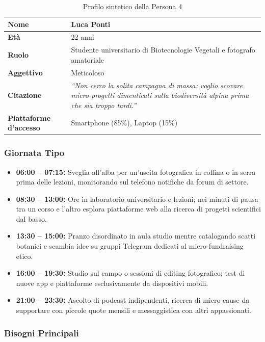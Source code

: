 \documentclass[11pt,a4paper]{article}
\begin{document}
\begin{table}[h!]
\centering
\small
\begin{tabular}{|p{3.5cm}|p{11.5cm}|}
\hline
\textbf{Nome} & Luca Ponti \\ \hline
\textbf{Età} & 22 anni \\ \hline
\textbf{Ruolo} & Studente universitario di Biotecnologie Vegetali e fotografo amatoriale \\ \hline
\textbf{Aggettivo} & Meticoloso \\ \hline
\textbf{Citazione} & \textit{``Non cerco la solita campagna di massa: voglio scovare micro-progetti dimenticati sulla biodiversità alpina prima che sia troppo tardi.''} \\ \hline
\textbf{Piattaforme d'accesso} & Smartphone (85\%), Laptop (15\%) \\ \hline
\end{tabular}
\caption{Profilo sintetico della Persona 4}
\label{tab:persona4}
\end{table}

\subsubsection{Giornata Tipo}
\begin{itemize}
    \item \textbf{06:00 -- 07:15:} Sveglia all'alba per un'uscita fotografica in collina o in serra prima delle lezioni, monitorando sul telefono notifiche da forum di settore.
    \item \textbf{08:30 -- 13:00:} Ore in laboratorio universitario e lezioni; nei minuti di pausa tra un corso e l'altro esplora piattaforme web alla ricerca di progetti scientifici dal basso.
    \item \textbf{13:30 -- 15:00:} Pranzo disordinato in aula studio mentre catalogando scatti botanici e scambia idee su gruppi Telegram dedicati al micro-fundraising etico.
    \item \textbf{16:00 -- 19:30:} Studio sul campo o sessioni di editing fotografico; test di nuove app e piattaforme esclusivamente da dispositivi mobili.
    \item \textbf{21:00 -- 23:30:} Ascolto di podcast indipendenti, ricerca di micro-cause da supportare con piccole quote mensili e messaggistica con altri appassionati.
\end{itemize}

\subsubsection{Bisogni Principali}
\end{document}
